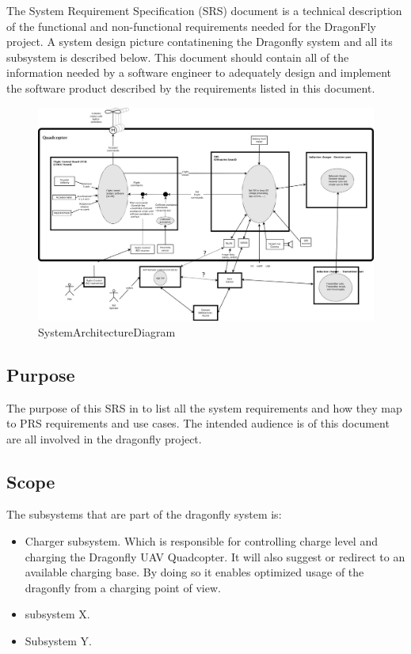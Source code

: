 \documentclass[a4paper]{article}
\begin{document}
The System Requirement Specification (SRS) document is a technical description of the functional and non-functional requirements needed for the DragonFly project. A system design picture contatinening the Dragonfly system and all its subsystem is described below. This document should contain all of the information needed by a software engineer to adequately design and implement the software product described by the requirements listed in this document. 

\begin{figure}[!h]
	\centering
	\includegraphics[width=\textwidth]{images/SystemArchitectureDiagram_DF.png}
	\caption{SystemArchitectureDiagram}
	\label{fig:sysarchdiag}
\end{figure}

\subsection{Purpose}

The purpose of this SRS in to list all the system requirements and how they map to PRS requirements and use cases. The intended audience is of this document are all involved in the dragonfly project.

\subsection{Scope}

The subsystems that are part of the dragonfly system is:
\begin{itemize}
	\item Charger subsystem. Which is responsible for controlling charge level and
	charging the Dragonfly UAV Quadcopter. It will also suggest or redirect to an available charging base. By doing so it enables optimized usage of the dragonfly from a charging point of view.
	\item subsystem X.
	\item Subsystem Y.
\end{itemize}
\end{document}
